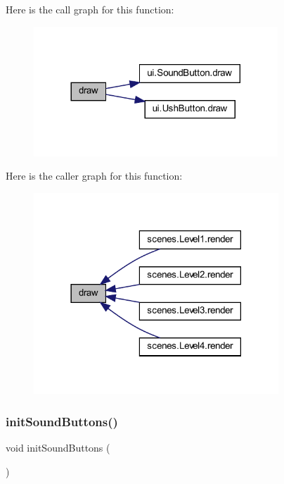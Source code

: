 Here is the call graph for this function\+:\nopagebreak
\begin{figure}[H]
\begin{center}
\leavevmode
\includegraphics[width=260pt]{classui_1_1_pause_overlay_a72fe1ffca978e99fd16994a10e7f8051_cgraph}
\end{center}
\end{figure}
Here is the caller graph for this function\+:\nopagebreak
\begin{figure}[H]
\begin{center}
\leavevmode
\includegraphics[width=261pt]{classui_1_1_pause_overlay_a72fe1ffca978e99fd16994a10e7f8051_icgraph}
\end{center}
\end{figure}
\mbox{\label{classui_1_1_pause_overlay_a7f98f78449c3156b81769d481bf99f3c}} 
\subsubsection{\texorpdfstring{init\+Sound\+Buttons()}{initSoundButtons()}}
{\footnotesize\ttfamily void init\+Sound\+Buttons (\begin{DoxyParamCaption}{ }\end{DoxyParamCaption})\hspace{0.3cm}{\ttfamily [private]}}




